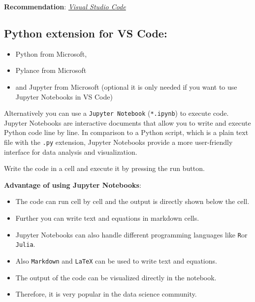 \documentclass[
  letterpaper,
  DIV=11,
  numbers=noendperiod]{scrreprt}
\providecommand{\tightlist}{%
  \setlength{\itemsep}{0pt}\setlength{\parskip}{0pt}}\usepackage{longtable,booktabs,array}
\begin{document}
\begin{tcolorbox}[enhanced jigsaw, leftrule=.75mm, bottomrule=.15mm, colbacktitle=quarto-callout-tip-color!10!white, title=\textcolor{quarto-callout-tip-color}{\faLightbulb}\hspace{0.5em}{Tip}, breakable, arc=.35mm, toptitle=1mm, opacityback=0, titlerule=0mm, coltitle=black, colback=white, opacitybacktitle=0.6, colframe=quarto-callout-tip-color-frame, left=2mm, rightrule=.15mm, toprule=.15mm, bottomtitle=1mm]

\textbf{Recommendation}:
\emph{\href{https://code.visualstudio.com/download}{Visual Studio Code}}

\end{tcolorbox}

\subsection*{Python extension for VS
Code:}\label{python-extension-for-vs-code}

\begin{itemize}
\tightlist
\item
  Python from Microsoft,
\item
  Pylance from Microsoft
\item
  and Jupyter from Microsoft (optional it is only needed if you want to
  use Jupyter Notebooks in VS Code)
\end{itemize}

Alternatively you can use a \texttt{Jupyter\ Notebook}
(\texttt{*.ipynb}) to execute code. Jupyter Notebooks are interactive
documents that allow you to write and execute Python code line by line.
In comparison to a Python script, which is a plain text file with the
\texttt{.py} extension, Jupyter Notebooks provide a more user-friendly
interface for data analysis and visualization.

Write the code in a cell and execute it by pressing the run button.

\textbf{Advantage of using Jupyter Notebooks}:

\begin{itemize}
\tightlist
\item
  The code can run cell by cell and the output is directly shown below
  the cell.
\item
  Further you can write text and equations in markdown cells.
\item
  Jupyter Notebooks can also handle different programming languages like
  \texttt{R}or \texttt{Julia}.
\item
  Also \texttt{Markdown} and \texttt{LaTeX} can be used to write text
  and equations.
\item
  The output of the code can be visualized directly in the notebook.
\item
  Therefore, it is very popular in the data science community.
\end{itemize}
\end{document}
